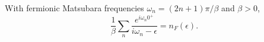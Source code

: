 \documentclass{article}
\begin{document}
With fermionic Matsubara frequencies $\omega_n = (2n+1)\pi/\beta$ and $\beta>0$,
\begin{equation}
\frac{1}{\beta}\sum_{n} \frac{e^{i\omega_n 0^+}}{i\omega_n - \epsilon} = n_F(\epsilon) .
\label{eq:occ}
\end{equation}
\end{document}

